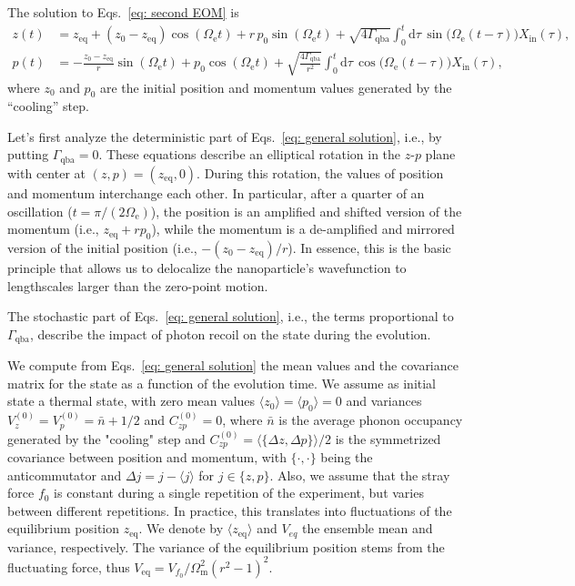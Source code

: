 \documentclass[aps, 
reprint, 
notitlepage,  superscriptaddress, 
onecolumn]{revtex4-1}
\newcommand{\<}{\langle}
\renewcommand{\>}{\rangle}
\newcommand{\dd}{\mathrm{d}}
\newcommand{\inn}{\mathrm{in}}
\newcommand{\Om}{\Omega_\mathrm{m}}
\newcommand{\Gqba}{\Gamma_\text{qba}}
\newcommand{\Oe}{\Omega_\mathrm{e}}
\begin{document}
The solution to Eqs.~\eqref{eq: second EOM} is
%
\begin{subequations}
    \label{eq: general solution}
    \begin{align}
    z(t) &= z_\mathrm{eq}+\left(z_0-z_\mathrm{eq}\right) \cos(\Oe t) + r\,p_0\sin(\Oe t) + \sqrt{4\Gqba} \int_0^t\dd\tau\,\sin\big( \Oe(t-\tau)\big) X_\inn(\tau), \\
    p(t) &= -\frac{z_0-z_\mathrm{eq}}{r} \sin(\Oe t) + p_0\cos(\Oe t) + \sqrt{\frac{4\Gqba}{r^2}} \int_0^t\dd\tau\,\cos\big( \Oe(t-\tau)\big) X_\inn(\tau),
    \end{align}
\end{subequations}
where $z_0$ and $p_0$ are the initial position and momentum values generated by the ``cooling'' step.

Let's first analyze the deterministic part of Eqs.~\eqref{eq: general solution}, i.e., by putting $\Gqba=0$.
%
These equations describe an elliptical rotation in the $z$-$p$ plane with center at $(z,p)=(z_\mathrm{eq},0)$.
%
During this rotation, the values of position and momentum interchange each other.
%
In particular, after a quarter of an oscillation ($t=\pi/(2\Oe)$), the position is an amplified and shifted version of the momentum (i.e., $z_\mathrm{eq}+r p_0$), while the momentum is a de-amplified and mirrored version of the initial position (i.e., $-(z_0-z_\mathrm{eq})/r$).
%
In essence, this is the basic principle that allows us to delocalize the nanoparticle's wavefunction to lengthscales larger than the zero-point motion.

The stochastic part of Eqs.~\eqref{eq: general solution}, i.e., the terms proportional to $\Gqba$, describe the impact of photon recoil on the state during the evolution.

We compute from Eqs.~\eqref{eq: general solution} the mean values and the covariance matrix for the state as a function of the evolution time.
We assume as initial state a thermal state, with zero mean values $\langle z_0 \rangle=\langle p_0\rangle=0$ and variances $V_z^{(0)}=V_p^{(0)}=\bar{n}+1/2$ and $C_{zp}^{(0)}=0$, where $\bar{n}$ is the average phonon occupancy generated by the "cooling" step and $C_{zp}^{(0)} = \langle \{ \Delta z, \Delta p\}\rangle/2$ is the symmetrized covariance between position and momentum, with $\{\cdot, \cdot\}$ being the anticommutator and $\Delta j = j-\langle j \rangle$ for $j \in\{z,p\}$.
%
Also, we assume that the stray force $f_0$ is constant during a single repetition of the experiment, but varies between different repetitions. In practice, this translates into fluctuations of the equilibrium position $z_\mathrm{eq}$. We denote by $\langle z_\mathrm{eq}\rangle$ and $V_{eq}$ the ensemble mean and variance, respectively.
The variance of the equilibrium position stems from the fluctuating force, thus $V_\mathrm{eq} = V_{f_0}/\Om^2(r^2-1)^2$.
\end{document}
